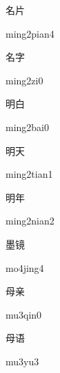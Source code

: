 \begin{multicols*}{2}
\begin{verbete}{名片}
\begin{pronuncia}{ming2pian4}
\end{pronuncia}
\end{verbete}

\begin{verbete}[ming2zi0]{名字}
\begin{pronuncia}{ming2zi0}
\end{pronuncia}
\end{verbete}

\begin{verbete}{明白}
\begin{pronuncia}{ming2bai0}
\end{pronuncia}
\end{verbete}

\begin{verbete}{明天}
\begin{pronuncia}{ming2tian1}
\end{pronuncia}
\end{verbete}

\begin{verbete}{明年}
\begin{pronuncia}{ming2nian2}
\end{pronuncia}
\end{verbete}

\begin{verbete}[mo4jing4]{墨镜}
\begin{pronuncia}{mo4jing4}
\end{pronuncia}
\end{verbete}

\begin{verbete}[mu3qin0]{母亲}
\begin{pronuncia}{mu3qin0}
\end{pronuncia}
\end{verbete}                                                                     

\begin{verbete}[mu3yu3]{母语}                                               
\begin{pronuncia}{mu3yu3}
\end{pronuncia}
\end{verbete}                                                                     

\end{multicols*}
